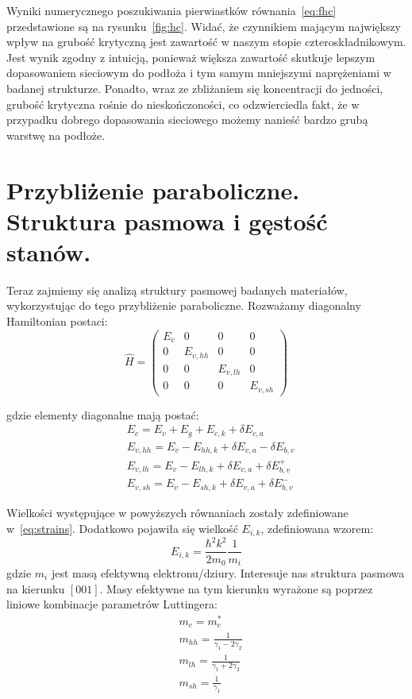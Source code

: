 \documentclass[12pt,openany,a4paper]{book}
\begin{document}
Wyniki numerycznego poszukiwania pierwiastków równania~\ref{eq:fhc} przedstawione są 
na rysunku~\ref{fig:hc}. Widać, że czynnikiem mającym największy wpływ na grubość krytyczną jest
zawartość  w naszym stopie czteroskładnikowym. Jest wynik zgodny z intuicją, ponieważ
większa zawartość  skutkuje lepszym dopasowaniem sieciowym do podłoża i tym samym
mniejszymi naprężeniami w badanej strukturze. Ponadto, wraz ze zbliżaniem się koncentracji
 do jedności, grubość krytyczna rośnie do nieskończoności, co odzwierciedla fakt, że w przypadku
dobrego dopasowania sieciowego możemy nanieść bardzo grubą warstwę na podłoże.

\section{Przybliżenie paraboliczne. Struktura pasmowa i gęstość stanów.
\label{sec:parabolic}}

Teraz zajmiemy się analizą struktury pasmowej badanych materiałów, wykorzystując do tego
przybliżenie paraboliczne. Rozważamy diagonalny Hamiltonian postaci:
\begin{equation}
	\hat{H} = 
	\begin{pmatrix}
		E_c & 0 & 0 & 0\\
		0 & E_{v,hh} & 0 & 0\\
		0 & 0 & E_{v,lh} & 0\\
		0 & 0 & 0 & E_{v,sh}
	\end{pmatrix}
	\label{eq:hamiltonian}
\end{equation}

gdzie elementy diagonalne mają postać:
\begin{align}
	&E_c = E_v + E_g + E_{c,k} + \delta E_{c,a}\\
	&E_{v,hh} = E_v - E_{hh,k} + \delta E_{v,a} - \delta E_{b,v}\\
	&E_{v,lh} = E_v - E_{lh,k} + \delta E_{v,a} + \delta E_{b,v}^{+}\\
	&E_{v,sh} = E_v - E_{sh,k} + \delta E_{v,a} + \delta E_{b,v}^{-}
\end{align}

Wielkości występujące w powyższych równaniach zostały zdefiniowane w~\eqref{eq:strains}.
Dodatkowo pojawiła się wielkość \(E_{i,k}\), zdefiniowana wzorem:
\begin{equation}
	E_{i,k} = \frac{\hbar^2 k^2}{2 m_0} \frac{1}{m_i}
	\label{eq:parabolic}
\end{equation}
gdzie \(m_i\) jest masą efektywną elektronu/dziury. Interesuje nas struktura pasmowa na kierunku \([0 0 1]\).
Masy efektywne na tym kierunku wyrażone są poprzez liniowe kombinacje parametrów Luttingera:
\begin{align*}
	&m_c = m_c^{\ast}\\
	&m_{hh} = \frac{1}{\gamma_1 - 2\gamma_2}\\
	&m_{lh} = \frac{1}{\gamma_1 + 2\gamma_2}\\
	&m_{sh} = \frac{1}{\gamma_1}
\end{align*}
\end{document}
